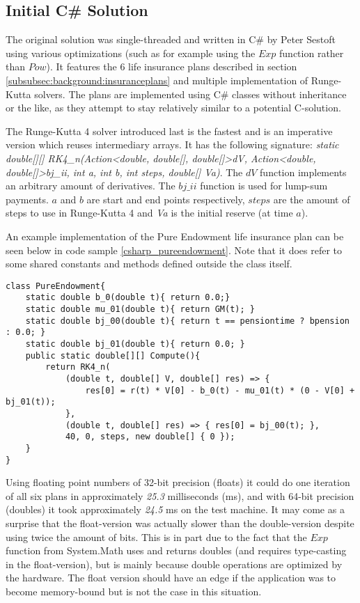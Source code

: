 \subsection{Initial C\# Solution}
The original solution was single-threaded and written in C\# by Peter Sestoft using various optimizations (such as for example using the $Exp$ function rather than $Pow$).
It features the 6 life insurance plans described in section \ref{subsubsec:background:insuranceplans} and multiple implementation of Runge-Kutta solvers.
The plans are implemented using C\# classes without inheritance or the like, as they attempt to stay relatively similar to a potential C-solution.

The Runge-Kutta 4 solver introduced last is the fastest and is an imperative version which reuses intermediary arrays.
It has the following signature: \textit{static double[][] RK4\_n(Action\textless{}double, double[], double[]\textgreater{}dV, Action\textless{}double, double[]\textgreater{}bj\_ii, int a, int b, int steps, double[] Va)}.
The $dV$ function implements an arbitrary amount of derivatives.
The $bj\_ii$ function is used for lump-sum payments.
$a$ and $b$ are start and end points respectively, $steps$ are the amount of steps to use in Runge-Kutta 4 and \textit{Va} is the initial reserve (at time $a$).

An example implementation of the Pure Endowment life insurance plan can be seen below in code sample \ref{csharp_pureendowment}. 
Note that it does refer to some shared constants and methods defined outside the class itself.

\begin{lstlisting}[language=CSharp, caption=The pure endowment insurance plan expressed in C\#, label=csharp_pureendowment]
class PureEndowment{
    static double b_0(double t){ return 0.0;}
    static double mu_01(double t){ return GM(t); }
    static double bj_00(double t){ return t == pensiontime ? bpension : 0.0; }
    static double bj_01(double t){ return 0.0; }
    public static double[][] Compute(){
        return RK4_n(
            (double t, double[] V, double[] res) => { 
                res[0] = r(t) * V[0] - b_0(t) - mu_01(t) * (0 - V[0] + bj_01(t)); 
            },
            (double t, double[] res) => { res[0] = bj_00(t); },
            40, 0, steps, new double[] { 0 });
    }
}
\end{lstlisting}

Using floating point numbers of 32-bit precision (floats) it could do one iteration of all six plans in approximately \emph{25.3} milliseconds (ms), and with 64-bit precision (doubles) it took approximately \emph{24.5} ms on the test machine.
It may come as a surprise that the float-version was actually slower than the double-version despite using twice the amount of bits.
This is in part due to the fact that the $Exp$ function from System.Math uses and returns doubles (and requires type-casting in the float-version), but is mainly because double operations are optimized by the hardware\cite{northrup2008mcts}.
The float version should have an edge if the application was to become memory-bound but is not the case in this situation.